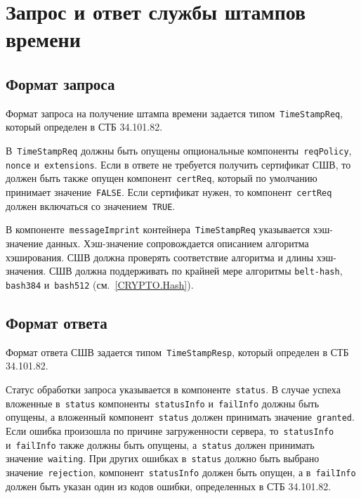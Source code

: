 \section{Запрос и ответ службы штампов времени}\label{FMT.TSP}

\subsection{Формат запроса}\label{FMT.TSP.Req}

Формат запроса на получение штампа времени задается 
типом~\texttt{TimeStampReq}, который определен в СТБ 34.101.82. 

В~\texttt{TimeStampReq} должны быть опущены опциональные 
компоненты~\texttt{reqPolicy}, \texttt{nonce} и~\texttt{extensions}. 
%
Если в ответе не требуется получить сертификат СШВ, 
то должен быть также опущен компонент~\texttt{certReq},
который по умолчанию принимает значение~\texttt{FALSE}.
%
Если сертификат нужен, то компонент~\texttt{certReq}
должен включаться со значением~\texttt{TRUE}.

В компоненте~\texttt{messageImprint} контейнера~\texttt{TimeStampReq}
указывается хэш-значение данных. 
Хэш-значение сопровождается описанием алгоритма хэширования.
СШВ должна проверять соответствие алгоритма и длины хэш-значения.
СШВ должна поддерживать по крайней мере алгоритмы \texttt{belt-hash},
\texttt{bash384} и~\texttt{bash512} (см.~\ref{CRYPTO.Hash}).

\subsection{Формат ответа}\label{FMT.TSP.Resp}
 
Формат ответа СШВ задается типом~\texttt{TimeStampResp}, который определен 
в СТБ 34.101.82. 

Статус обработки запроса указывается в компоненте~\texttt{status}.
%
В случае успеха вложенные в~\texttt{status} компоненты~\texttt{statusInfo} 
и~\texttt{failInfo} должны быть опущены, а вложенный
компонент~\texttt{status} должен принимать значение~\texttt{granted}.
%
Если ошибка произошла по причине загруженности сервера, 
то~\texttt{statusInfo} и~\texttt{failInfo} также должны быть опущены, 
а~\texttt{status} должен принимать значение~\texttt{waiting}.
%
При других ошибках в~\texttt{status} должно быть выбрано 
значение~\texttt{rejection}, компонент~\texttt{statusInfo}
должен быть опущен, а в~\texttt{failInfo} должен быть указан один из 
кодов ошибки, определенных в СТБ 34.101.82.

